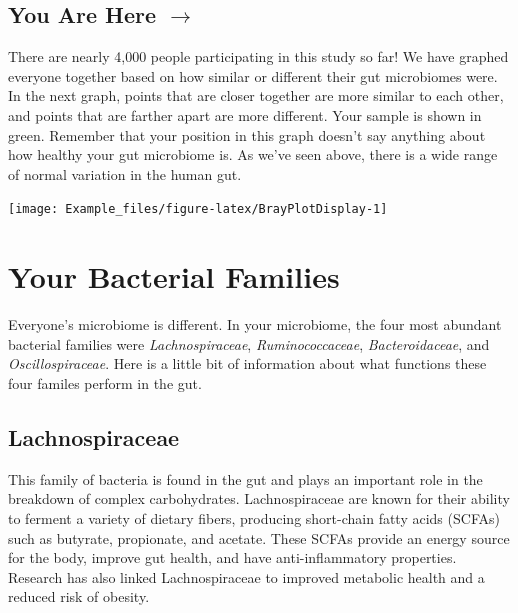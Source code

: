 \documentclass[
]{article}
\begin{document}
\begin{multicols}{2}
\raggedcolumns

\vspace*{\fill}
\section{You Are Here $\boldsymbol{\rightarrow}$}
\begin{small}
There are nearly 4,000 people participating in this study so far! We have 
graphed everyone together based on how similar or different their gut
microbiomes were. In the next graph, points that are closer together
are more similar to each other, and points that are farther apart are
more different. Your sample is shown in green. Remember that your 
position in this graph doesn't say anything about how healthy your
gut microbiome is. As we've seen above, there is a wide range of 
normal variation in the human gut.
\end{small}

\vspace*{\fill}
\columnbreak

\vspace*{1cm}

\begin{center}\texttt{[image: Example\_files/figure-latex/BrayPlotDisplay-1]} \end{center}

\vspace*{\fill}

\end{multicols}

\newpage

\section{Your Bacterial Families}

Everyone's microbiome is different. In your microbiome, the four most
abundant bacterial families were \textit{Lachnospiraceae},
\textit{Ruminococcaceae}, \textit{Bacteroidaceae}, and
\textit{Oscillospiraceae}. Here is a little bit of information about
what functions these four familes perform in the gut.

\subsection{Lachnospiraceae}

\begin{small}
This family of bacteria is found in the gut and plays an important role in the 
breakdown of complex carbohydrates. Lachnospiraceae are known for their ability 
to ferment a variety of dietary fibers, producing short-chain fatty acids 
(SCFAs) such as butyrate, propionate, and acetate. These SCFAs provide an energy
source for the body, improve gut health, and have anti-inflammatory properties. 
Research has also linked Lachnospiraceae to improved metabolic health and a 
reduced risk of obesity.
\end{small}
\end{document}
